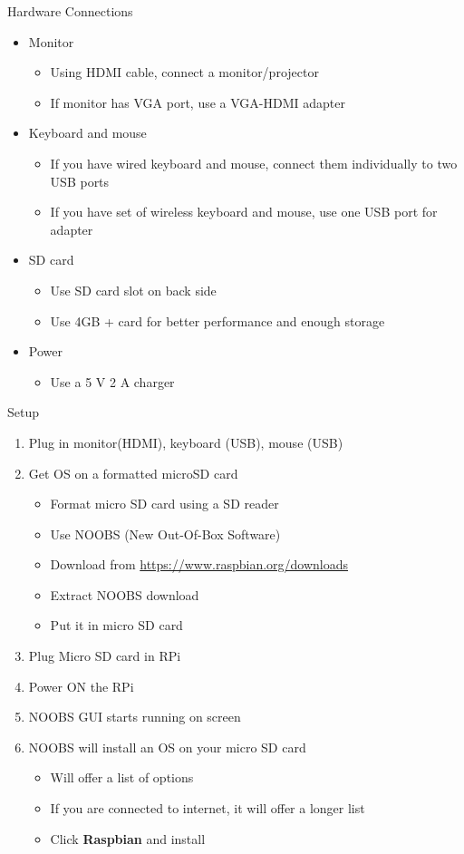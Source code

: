 \begin{frame}{Hardware Connections}
	\begin{itemize}
		\item Monitor
		\begin{itemize}
			\item Using HDMI cable, connect a monitor/projector
			\item If monitor has VGA port, use a VGA-HDMI adapter
		\end{itemize}
		\item Keyboard and mouse
		\begin{itemize}
			\item If you have wired keyboard and mouse, connect them individually to two USB ports
			\item If you have set of wireless keyboard and mouse, use one USB port for adapter
		\end{itemize}
		\item SD card
		\begin{itemize}
			\item Use SD card slot on back side
			\item Use 4GB + card for better performance and enough storage
		\end{itemize}
		\item Power
		\begin{itemize}
			\item Use a 5 V 2 A charger
		\end{itemize}
	\end{itemize}
\end{frame}

\begin{frame}{Setup}
	\begin{enumerate}
		\item Plug in monitor(HDMI), keyboard (USB), mouse (USB)
		\item Get OS on a formatted microSD card
		\begin{itemize}
			\item Format micro SD card using a SD reader
			\item Use NOOBS (New Out-Of-Box Software)
			\item Download from \url{https://www.raspbian.org/downloads}
			\item Extract NOOBS download
			\item Put it in micro SD card
		\end{itemize}
		\item Plug Micro SD card in RPi
		\item Power ON the RPi
		\item NOOBS GUI starts running on screen
		\item NOOBS will install an OS on your micro SD card
		\begin{itemize}
			\item Will offer a list of options
			\item If you are connected to internet, it will offer a longer list
			\item Click \textbf{Raspbian} and install
		\end{itemize}
	\end{enumerate}
\end{frame}

